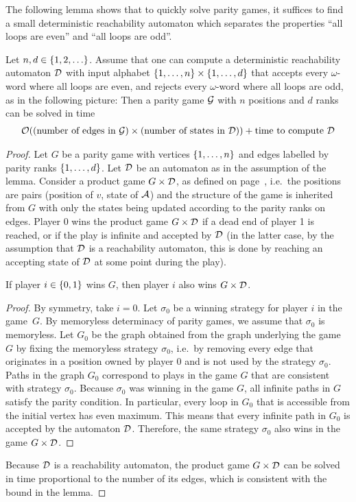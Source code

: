 The following lemma shows that to quickly solve parity games, it suffices to find a small deterministic reachability automaton which separates the properties ``all loops are even'' and ``all loops are odd''.
\begin{lemma}
	\label{lem:quasi-red}
	Let $n,d \in \{1,2,\ldots\}$.   Assume that one can compute a deterministic reachability automaton $\mathcal{D}$ with input alphabet $\{1,\ldots,n\} \times \{1,\ldots,d\}$  that accepts every $\omega$-word where all loops are even, and rejects every $\omega$-word where all loops are odd, as in the following picture:
Then a parity game $\mathcal{G}$  with $n$ positions and $d$ ranks can be solved in time
\begin{align*}
\mathcal{O}((\text{number of edges in $\mathcal{G}$}) \times \text{(number of states in $\mathcal{D}$)})  + \text{time to compute $\mathcal{D}$}
\end{align*}
\end{lemma}
\begin{proof} 
	Let $G$ be a parity game with vertices   $\{1,\ldots,n\}$ and edges labelled by parity ranks $\{1,\ldots,d\}$. Let $\mathcal{D}$ be an automaton as in the assumption of the lemma.  Consider a product game $G \times \mathcal{D}$, as defined on page~\pageref{page:product-game}, i.e.~the positions are pairs (position of $v$, state of $\mathcal{A}$) and the structure of the game is inherited from $G$ with only the states being updated according to the parity ranks on edges. Player $0$ wins the product game $G \times \mathcal{D}$ if a dead end of player 1 is reached, or if the play is infinite and accepted by $\mathcal{D}$ (in the latter case, by the assumption that $\mathcal{D}$ is a reachability automaton,  this is done by reaching an accepting state of $\mathcal{D}$ at some point during the play). 
\begin{claim}
	If player $i \in \{0,1\}$ wins $G$, then player $i$  also wins $G \times \mathcal{D}$.
\end{claim}
\begin{proof}
By symmetry, take $i=0$.  Let $\sigma_0$ be a winning strategy for player $i$ in the game~$G$. By memoryless determinacy of parity games, we assume that $\sigma_0$ is memoryless. Let $G_0$ be the graph obtained from the graph underlying the game $G$ by fixing the memoryless strategy $\sigma_0$, i.e.~by removing every edge that originates in a position owned by player $0$ and is not used by the strategy $\sigma_0$. Paths in the graph $G_0$ correspond to plays in the game $G$ that are consistent with strategy $\sigma_0$. Because $\sigma_0$ was winning in the game $G$, all infinite paths in $G$ satisfy the parity condition.  In particular, every  loop in $G_0$ that is accessible from the initial vertex has even maximum. This means  that every infinite path in $G_0$ is accepted by the automaton $\mathcal{D}$. Therefore, the same strategy $\sigma_0$ also wins in the game $G \times \mathcal{D}$.
\end{proof}
Because $\mathcal{D}$ is a reachability automaton, the product game $G \times \mathcal{D}$ can be solved in time proportional to the number of its edges, which is consistent with the bound in the lemma.
\end{proof}


